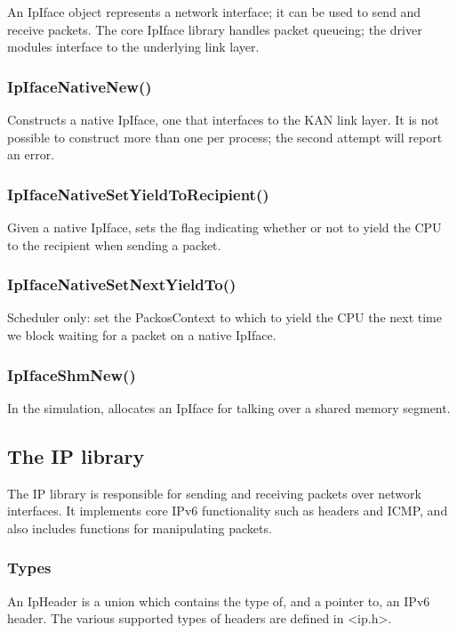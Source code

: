 \documentclass{article}
\begin{document}
An IpIface object represents a network interface; it can be used to send and
receive packets.  The core IpIface library handles packet queueing;
the driver modules interface to the underlying link layer.

\subsubsection{IpIfaceNativeNew()}

Constructs a native IpIface, one that interfaces to the KAN link
layer.  It is not possible to construct more than one per process; the
second attempt will report an error.

\subsubsection{IpIfaceNativeSetYieldToRecipient()}

Given a native IpIface, sets the flag
indicating whether or not to yield the CPU to the recipient when
sending a packet.

\subsubsection{IpIfaceNativeSetNextYieldTo()}

Scheduler only: set the PackosContext to which to yield the CPU the
next time we block waiting for a packet on a native IpIface.

\subsubsection{IpIfaceShmNew()}

In the simulation, allocates an IpIface for talking over a shared
memory segment.

\subsection{The IP library}

The IP library is responsible for sending and receiving packets over
network interfaces.  It implements core IPv6 functionality such as
headers and ICMP, and also includes functions for manipulating
packets.

\subsubsection{Types}

An IpHeader is a union which contains the type of, and a pointer to,
an IPv6 header.  The various supported types of headers are defined in
<ip.h>.
\end{document}

